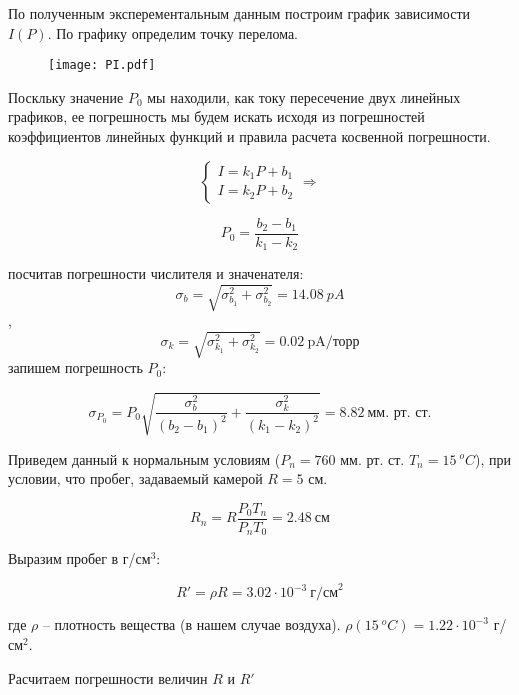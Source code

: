     

    По полученным эксперементальным данным построим график зависимости $I(P)$. По графику определим точку перелома.

    \begin{figure}
        \centering
        \texttt{[image: PI.pdf]}
        \caption{}
        \label{fig:1}
    \end{figure}
    
    Поскльку значение $P_0$ мы находили, как току пересечение двух линейных графиков, ее погрешность
    мы будем искать исходя из погрешностей коэффициентов линейных функций и правила расчета косвенной погрешности.

    \begin{equation*}
        \begin{cases}
            I = k_1 P + b_1 \\
            I = k_2 P + b_2
        \end{cases}
        \Rightarrow
    \end{equation*}

    \[ P_0 = \frac{b_2 - b_1}{k_1 - k_2} \]

    посчитав погрешности числителя и значенателя: 
    $$\sigma_b = \sqrt{\sigma_{b_1}^2 + \sigma_{b_2}^2} = 14.08 ~ pA$$,
    $$\sigma_k = \sqrt{\sigma_{k_1}^2 + \sigma_{k_2}^2} = 0.02 ~ \text{pA/торр}$$ 
    запишем погрешность $P_0$:

    \[ \sigma_{P_0} = P_0 \sqrt{\frac{\sigma_b^2}{(b_2 - b_1)^2} + \frac{\sigma_k^2}{(k_1 - k_2)^2}} = 8.82 ~ \text{мм. рт. ст.} \]

    \begin{center}
    \end{center}

    Приведем данный к нормальным условиям ($P_n = 760$ мм. рт. ст. $T_n = 15 ~ ^oC$), при условии,
    что пробег, задаваемый камерой $R = 5$ см.

    \[ R_n = R \frac{P_0 T_n}{P_n T_0} = 2.48 ~ \text{см} \]

    Выразим пробег в г/см$^3$:

    \[ R' = \rho R = 3.02 \cdot 10^{-3} ~ \text{г/см}^2 \]

    где $\rho$ -- плотность вещества (в нашем случае воздуха). $\rho(15 ~ ^oC) = 1.22 \cdot 10^{-3}$ г/см$^2$.

    Расчитаем погрешности величин $R$ и $R'$

